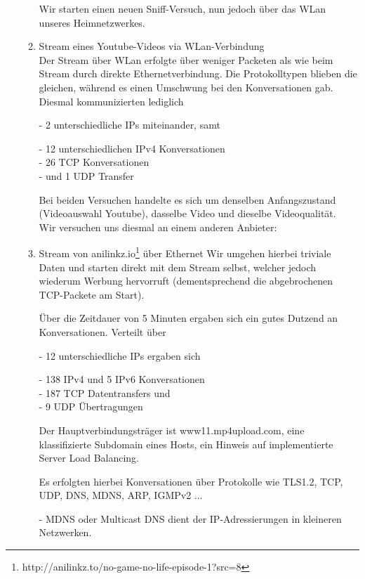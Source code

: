 \documentclass[11pt]{article}
\begin{document}
\begin{enumerate}
\begin{enumerate}[\thesection .1]
        Wir starten einen neuen Sniff-Versuch, nun jedoch über das WLan unseres Heimnetzwerkes.
        \item Stream eines Youtube-Videos via WLan-Verbindung\\
        Der Stream über WLan erfolgte über weniger Packeten als wie beim Stream durch direkte Ethernetverbindung.
        Die Protokolltypen blieben die gleichen, während es einen Umschwung bei den Konversationen gab.
        Diesmal kommunizierten lediglich
        \begin{addmargin}[1em]{1em}
            - 2 unterschiedliche IPs miteinander, samt
            \begin{addmargin}[1em]{1em}
                - 12 unterschiedlichen IPv4 Konversationen\\
                - 26 TCP Konversationen\\
                - und 1 UDP Transfer\\
            \end{addmargin}
        \end{addmargin}

            Bei beiden Versuchen handelte es sich um denselben Anfangszustand (Videoauswahl Youtube),
            dasselbe Video und dieselbe Videoqualität.\\

            Wir versuchen uns diesmal an einem anderen Anbieter:
            \item Stream von anilinkz.io\footnote[1]{http://anilinkz.to/no-game-no-life-episode-1?src=8} über Ethernet
            Wir umgehen hierbei triviale Daten und starten direkt mit dem Stream selbst, welcher jedoch wiederum Werbung hervorruft
            (dementsprechend die abgebrochenen TCP-Packete am Start).

            Über die Zeitdauer von 5 Minuten ergaben sich ein gutes Dutzend an Konversationen.
            Verteilt über
            \begin{addmargin}[1em]{1em}
                - 12 unterschiedliche IPs ergaben sich
                \begin{addmargin}[1em]{1em}
                    - 138 IPv4 und 5 IPv6 Konversationen\\
                    - 187 TCP Datentransfers und \\
                    - 9 UDP Übertragungen\\
                \end{addmargin}
            \end{addmargin}
            Der Hauptverbindungsträger ist www11.mp4upload.com, eine klassifizierte Subdomain eines Hosts, ein Hinweis auf implementierte Server Load Balancing.

            Es erfolgten hierbei Konversationen über Protokolle wie TLS1.2, TCP, UDP, DNS, MDNS, ARP, IGMPv2 ...
            \begin{addmargin}[1em]{1em}
                - MDNS oder Multicast DNS dient der IP-Adressierungen in kleineren Netzwerken.
            \end{addmargin}
        \end{enumerate}
    \end{enumerate}
\end{document}
